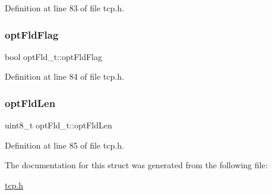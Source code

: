 Definition at line 83 of file tcp.\+h.

\mbox{\label{structoptFld__t_ac73a04aef59f8fa1e56dfa7120edda44}} 
\subsubsection{\texorpdfstring{opt\+Fld\+Flag}{optFldFlag}}
{\footnotesize\ttfamily bool opt\+Fld\+\_\+t\+::opt\+Fld\+Flag}



Definition at line 84 of file tcp.\+h.

\mbox{\label{structoptFld__t_a910e4d371530c9c598bfae3e9fcdac3f}} 
\subsubsection{\texorpdfstring{opt\+Fld\+Len}{optFldLen}}
{\footnotesize\ttfamily uint8\+\_\+t opt\+Fld\+\_\+t\+::opt\+Fld\+Len}



Definition at line 85 of file tcp.\+h.



The documentation for this struct was generated from the following file\+:\begin{DoxyCompactItemize}
\item 
\hyperlink{tcp_8h}{tcp.\+h}\end{DoxyCompactItemize}

